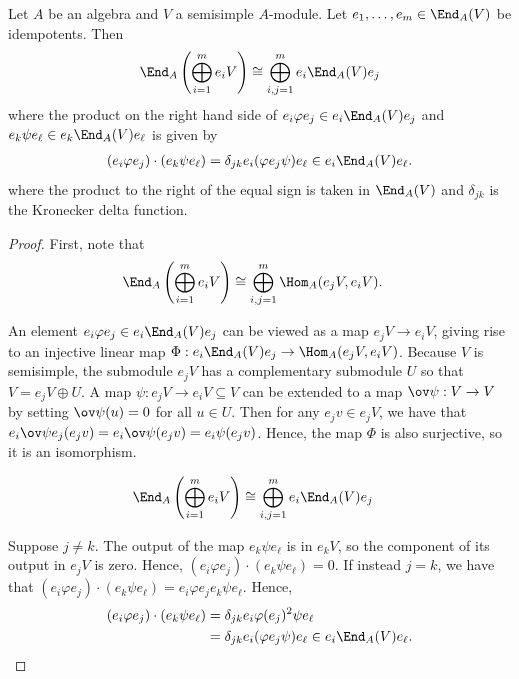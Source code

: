 \begin{lemma}\label{lem:decompose_by_idempotents} Let $A$ be an algebra and $V$ a semisimple $A$-module. Let $e_1,\dots,e_m\in\End_A(V)$ be idempotents. Then \begin{align*}
    \End_A\left(\bigoplus_{i=1}^me_i V\right)\cong \bigoplus_{i,j=1}^m e_i\End_A(V) e_j
\end{align*} where the product on the right hand side of $e_i\varphi e_j\in e_i\End_A(V)e_j$ and $e_k\psi e_\ell\in e_k\End_A(V)e_\ell$ is given by \begin{align*}
    (e_i\varphi e_j)\cdot(e_k\psi e_\ell)=\delta_{jk}e_i(\varphi e_j\psi)e_\ell\in e_i\End_A(V) e_\ell.
\end{align*} where the product to the right of the equal sign is taken in $\End_A(V)$ and $\delta_{jk}$ is the Kronecker delta function.
\end{lemma}

\begin{proof}
First, note that \begin{align*}
    \End_A\left(\bigoplus_{i=1}^me_i V\right)&\cong\bigoplus_{i,j=1}^m \Hom_A(e_j V, e_i V).
\end{align*}

An element $e_i\varphi e_j\in e_i\End_A(V) e_j$ can be viewed as a map $e_j V\to e_i V$, giving rise to an injective linear map $\Phi:e_i\End_A(V)e_j\to \Hom_A(e_jV, e_i V)$. Because $V$ is semisimple, the submodule $e_jV$ has a complementary submodule $U$ so that $V=e_j V\oplus U$. A map $\psi:e_j V\to e_iV\subseteq V$ can be extended to a map $\ov\psi:V\to V$ by setting $\ov\psi(u)=0$ for all $u\in U$. Then for any $e_jv\in e_jV$, we have that $e_i\ov\psi e_j(e_jv)=e_i\ov\psi(e_jv)=e_i\psi(e_jv)$. Hence, the map $\Phi$ is also surjective, so it is an isomorphism.

    \begin{align*}
        \End_A\left(\bigoplus_{i=1}^me_i V\right)&\cong\bigoplus_{i,j=1}^m e_i\End_A(V)e_j
    \end{align*}

    Suppose $j\neq k$. The output of the map $e_k\psi e_\ell$ is in $e_k V$, so the component of its output in $e_j V$ is zero. Hence, $(e_i\varphi e_j)\cdot(e_k\psi e_\ell)=0$. If instead $j=k$, we have that $(e_i\varphi e_j)\cdot(e_k\psi e_\ell)=e_i\varphi e_j e_k\psi e_\ell$. Hence, \begin{align*}
        (e_i\varphi e_j)\cdot(e_k\psi e_\ell)&=\delta_{jk}e_i\varphi (e_j)^2\psi e_\ell\\
        &=\delta_{jk}e_i(\varphi e_j\psi)e_\ell\in e_i\End_A(V) e_\ell. \qedhere
    \end{align*}
\end{proof}

